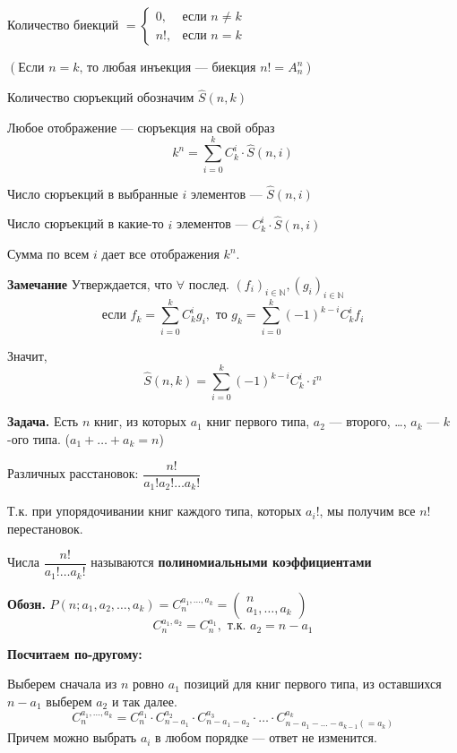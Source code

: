 \documentclass[10pt, a4paper]{article}
\begin{document}
\vspace{0.8cm}
\noindent
Количество биекций $= 
\begin{cases} 
0, & \text{если } n \neq k \\ 
n!, & \text{если } n = k 
\end{cases}$

\medskip
\noindent
$\left( \text{Если } n = k\text{, то любая инъекция --- биекция $n! = A_n^n$} \right)$


\medskip
\noindent
Количество сюръекций обозначим $\hat{S}(n, k)$

\medskip
\noindent
Любое отображение --- сюръекция на свой образ
\[ k^n = \sum_{i=0}^{k} C_k^i \cdot \hat{S}(n, i) \]

\medskip
\noindent Число сюръекций в выбранные $i$ элементов --- $\hat{S}(n, i)$

\medskip
\noindent Число сюръекций в какие-то $i$ элементов --- $C_k^i \cdot \hat{S}(n, i)$

\medskip
\noindent Сумма по всем $i$ дает все отображения $k^n$.

\medskip
\noindent \textbf{Замечание} Утверждается, что $\forall \text{ послед. } (f_i)_{i \in \mathbb{N}}, (g_i)_{i \in \mathbb{N}}$
\[ \text{если } f_k = \sum_{i=0}^{k} C_k^i g_i, \text{ то } g_k = \sum_{i=0}^{k} (-1)^{k-i} C_k^i f_i \]

\medskip
\noindent Значит,
\[ \hat{S}(n, k) = \sum_{i=0}^{k} (-1)^{k-i} C_k^i \cdot i^n \]


\noindent
\textbf{Задача.} Есть $n$ книг, из которых $a_1$ книг первого типа, $a_2$ --- второго, \dots, $a_k$ --- $k$-ого типа. ($a_1 + \dots + a_k = n$)

\medskip
\noindent
Различных расстановок: $\dfrac{n!}{a_1! a_2! \dots a_k!}$

\medskip
\noindent
Т.к. при упорядочивании книг каждого типа, которых $a_i!$, мы получим все $n!$ перестановок.

\medskip
\noindent
Числа $\dfrac{n!}{a_1! \dots a_k!}$ называются \textbf{полиномиальными коэффициентами}
\newpage

\medskip
\noindent
\textbf{Обозн.} $P(n; a_1, a_2, \dots, a_k) = C_n^{a_1, \dots, a_k} = \begin{pmatrix} n \\ a_1, \dots, a_k \end{pmatrix}$
\medskip
\[ C_n^{a_1, a_2} = C_n^{a_1}, \text{ т.к. } a_2 = n - a_1 \]

\noindent
\textbf{Посчитаем по-другому:}

\noindent 
Выберем сначала из $n$ ровно $a_1$ позиций для книг первого типа, из оставшихся $n - a_1$ выберем $a_2$ и так далее.
\[ C_n^{a_1, \dots, a_k} = C_n^{a_1} \cdot C_{n-a_1}^{a_2} \cdot C_{n-a_1-a_2}^{a_3} \cdot \dots \cdot C_{n-a_1-\dots-a_{k-1} (=a_k)}^{a_k} \]
Причем можно выбрать $a_i$ в любом порядке --- ответ не изменится.
\end{document}

